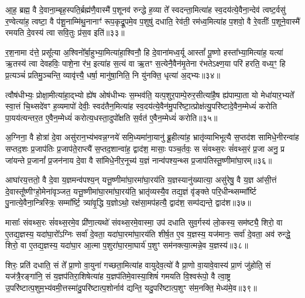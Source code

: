 आ॒ह॒ ब्रह्म॒ वै दे॒वाना॒म्बृह॒स्पति॒र्ब्रह्म॑णै॒वास्मै॑ प॒शूनव॑ रुन्द्धे ह॒व्या ते᳚ स्वदन्ता॒मित्या॑ह स्व॒दय॑त्ये॒वैना॒न्देव॑ त्वष्ट॒र्वसु॑ र॒ण्वेत्या॑ह॒ त्वष्टा॒ वै प॑शू॒नाम्मि॑थु॒नानाꣳ॑ रूप॒कृद्रू॒पमे॒व प॒शुषु॑ दधाति॒ रेव॑ती॒ रम॑ध्व॒मित्या॑ह प॒शवो॒ वै रे॒वतीः᳚ प॒शूने॒वास्मै॑ रमयति दे॒वस्य॑ त्वा सवि॒तुः प्र॑स॒व इति॑॥३३॥

र॒श॒नामा द॑त्ते॒ प्रसू᳚त्या अ॒श्विनो᳚र्बा॒हुभ्या॒मित्या॑हा॒श्विनौ॒ हि दे॒वाना॑मध्व॒र्यू आस्तां᳚ पू॒ष्णो हस्ता᳚भ्या॒मित्या॑ह॒ यत्या॑ ऋ॒तस्य॑ त्वा देवहविः॒ पाशे॒ना र॑भ॒ इत्या॑ह स॒त्यं वा ऋ॒तꣳ स॒त्येनै॒वैन॑मृ॒तेना र॑भते\-ऽक्ष्ण॒या परि॑ हरति॒ वध्य॒ꣳ॒ हि प्र॒त्यञ्चं॑ प्रतिमु॒ञ्चन्ति॒ व्यावृ॑त्त्यै॒ धर्\mbox{}षा॒ मानु॑षा॒निति॒ नि यु॑नक्ति॒ धृत्या॑ अ॒द्भ्यः॥३४॥

त्वौष॑धीभ्यः॒ प्रोक्षा॒मीत्या॑हा॒द्भ्यो ह्ये॑ष ओष॑धीभ्यः स॒म्भव॑ति॒ यत्प॒शुर॒पाम्पे॒रुर॒सीत्या॑है॒ष ह्य॑पाम्पा॒ता यो मेधा॑यार॒भ्यते᳚ स्वा॒त्तं चि॒थ्सदे॑वꣳ ह॒व्यमापो॑ देवीः॒ स्वद॑तैन॒मित्या॑ह स्व॒दय॑त्ये॒वैन॑मु॒परि॑ष्टा॒त्प्रोक्ष॑त्यु॒परि॑ष्टादे॒वैन॒म्मेध्यं॑ करोति पा॒यय॑त्यन्तर॒त ए॒वैन॒म्मेध्यं॑ करोत्य॒धस्ता॒दुपो᳚क्षति स॒र्वत॑ ए॒वैन॒म्मेध्यं॑ करोति॥३५॥

{\anuvakamend[{वसू॒निति॑ प्रस॒व इत्य॒द्भ्यो᳚\-ऽन्तर॒त ए॒वैन॒न्दश॑ च॥६॥}]}

अ॒ग्निना॒ वै होत्रा॑ दे॒वा असु॑रान॒भ्य॑भवन्न॒ग्नये॑ समि॒ध्यमा॑ना॒यानु॑ ब्रू॒हीत्या॑ह॒ भ्रातृ॑व्याभिभूत्यै स॒प्तद॑श सामिधे॒नीरन्वा॑ह सप्तद॒शः प्र॒जाप॑तिः प्र॒जाप॑ते॒राप्त्यै॑ स॒प्तद॒शान्वा॑ह॒ द्वाद॑श॒ मासाः॒ पञ्च॒र्तवः॒ स सं॑वथ्स॒रः सं॑वथ्स॒रं प्र॒जा अनु॒ प्र जा॑यन्ते प्र॒जानां᳚ प्र॒जन॑नाय दे॒वा वै सा॑मिधे॒नीर॒नूच्य॑ य॒ज्ञं नान्व॑पश्य॒न्थ्स प्र॒जाप॑तिस्तू॒ष्णीमा॑घा॒रम्॥३६॥

आघा॑रय॒त्ततो॒ वै दे॒वा य॒ज्ञमन्व॑पश्य॒न् यत्तू॒ष्णीमा॑घा॒रमा॑घा॒रय॑ति य॒ज्ञस्यानु॑ख्यात्या॒ असु॑रेषु॒ वै य॒ज्ञ आ॑सी॒त्तं दे॒वास्तू᳚ष्णीꣳहो॒मेना॑वृञ्जत॒ यत्तू॒ष्णीमा॑घा॒रमा॑घा॒रय॑ति॒ भ्रातृ॑व्यस्यै॒व तद्य॒ज्ञं वृ॑ङ्क्ते परि॒धीन्थ्सम्मा᳚र्ष्टि पु॒नात्ये॒वैना॒न्त्रिस्त्रिः॒ सम्मा᳚र्ष्टि॒ त्र्या॑वृ॒द्धि य॒ज्ञो\-ऽथो॒ रक्ष॑सा॒मप॑हत्यै॒ द्वाद॑श॒ सम्प॑द्यन्ते॒ द्वाद॑श॥३७॥

मासाः᳚ संवथ्स॒रः सं॑वथ्स॒रमे॒व प्री॑णा॒त्यथो॑ संवथ्स॒रमे॒वास्मा॒ उप॑ दधाति सुव॒र्गस्य॑ लो॒कस्य॒ सम॑ष्ट्यै॒ शिरो॒ वा ए॒तद्य॒ज्ञस्य॒ यदा॑घा॒रो᳚\-ऽग्निः सर्वा॑ दे॒वता॒ यदा॑घा॒रमा॑घा॒रय॑ति शीर्\mbox{}ष॒त ए॒व य॒ज्ञस्य॒ यज॑मानः॒ सर्वा॑ दे॒वता॒ अव॑ रुन्द्धे॒ शिरो॒ वा ए॒तद्य॒ज्ञस्य॒ यदा॑घा॒र आ॒त्मा प॒शुरा॑घा॒रमा॒घार्य॑ प॒शुꣳ सम॑नक्त्या॒त्मन्ने॒व य॒ज्ञस्य॑॥३८॥

शिरः॒ प्रति॑ दधाति॒ सं ते᳚ प्रा॒णो वा॒युना॑ गच्छता॒मित्या॑ह वायुदेव॒त्यो॑ वै प्रा॒णो वा॒यावे॒वास्य॑ प्रा॒णं जु॑होति॒ सं यज॑त्रै॒रङ्गा॑नि॒ सं य॒ज्ञप॑तिरा॒शिषेत्या॑ह य॒ज्ञप॑तिमे॒वास्या॒शिषं॑ गमयति वि॒श्वरू॑पो॒ वै त्वा॒ष्ट्र उ॒परि॑ष्टात्प॒शुम॒भ्य॑वमी॒त्तस्मा॑दु॒परि॑ष्टात्प॒शोर्नाव॑ द्यन्ति॒ यदु॒परि॑ष्टात्प॒शुꣳ स॑म॒नक्ति॒ मेध्य॑मे॒व॥३९॥

